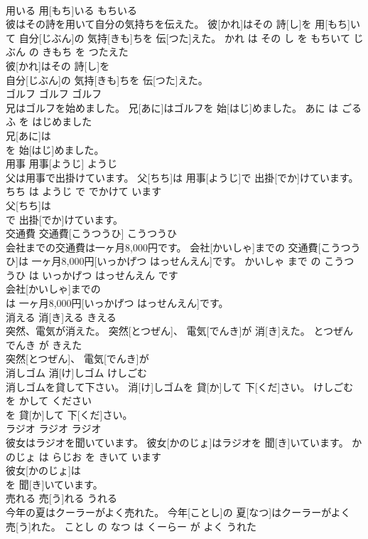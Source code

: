 \documentclass[8pt]{extreport}
\begin{document}
\begin{CJK}{UTF8}{min}
\\	用いる	用[もち]いる	もちいる	
\\	彼はその詩を用いて自分の気持ちを伝えた。	彼[かれ]はその 詩[し]を 用[もち]いて 自分[じぶん]の 気持[きも]ちを 伝[つた]えた。	かれ は その し を もちいて じぶん の きもち を つたえた	
\\	彼[かれ]はその 詩[し]を
\\	自分[じぶん]の 気持[きも]ちを 伝[つた]えた。			
\\	ゴルフ	ゴルフ	ゴルフ	
\\	兄はゴルフを始めました。	兄[あに]はゴルフを 始[はじ]めました。	あに は ごるふ を はじめました	
\\	兄[あに]は
\\	を 始[はじ]めました。			
\\	用事	用事[ようじ]	ようじ	
\\	父は用事で出掛けています。	父[ちち]は 用事[ようじ]で 出掛[でか]けています。	ちち は ようじ で でかけて います	
\\	父[ちち]は
\\	で 出掛[でか]けています。			
\\	交通費	交通費[こうつうひ]	こうつうひ	
\\	会社までの交通費は一ヶ月8,000円です。	会社[かいしゃ]までの 交通費[こうつうひ]は 一ヶ月8,000円[いっかげつ はっせんえん]です。	かいしゃ まで の こうつうひ は いっかげつ はっせんえん です	
\\	会社[かいしゃ]までの
\\	は 一ヶ月8,000円[いっかげつ はっせんえん]です。			
\\	消える	消[き]える	きえる	
\\	突然、電気が消えた。	突然[とつぜん]、 電気[でんき]が 消[き]えた。	とつぜん でんき が きえた	
\\	突然[とつぜん]、 電気[でんき]が
\\	消しゴム	消[け]しゴム	けしごむ	
\\	消しゴムを貸して下さい。	消[け]しゴムを 貸[か]して 下[くだ]さい。	けしごむ を かして ください	
\\	を 貸[か]して 下[くだ]さい。			
\\	ラジオ	ラジオ	ラジオ	
\\	彼女はラジオを聞いています。	彼女[かのじょ]はラジオを 聞[き]いています。	かのじょ は らじお を きいて います	
\\	彼女[かのじょ]は
\\	を 聞[き]いています。			
\\	売れる	売[う]れる	うれる	
\\	今年の夏はクーラーがよく売れた。	今年[ことし]の 夏[なつ]はクーラーがよく 売[う]れた。	ことし の なつ は くーらー が よく うれた	

\end{CJK}
\end{document}
